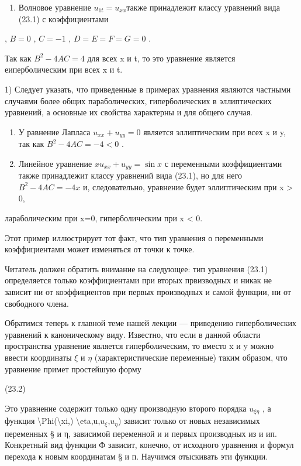 \documentclass[
]{article}
\providecommand{\tightlist}{%
  \setlength{\itemsep}{0pt}\setlength{\parskip}{0pt}}
\begin{document}
\begin{enumerate}
\def\labelenumi{\arabic{enumi}.}
\setcounter{enumi}{1}
\tightlist
\item
  Волновое уравнение \(u_{1t} = u_{xx}\)также принадлежит классу
  уравнений вида (23.1) с коэффициентами
\end{enumerate}

, \(B=0\) , \(C=-1\) , \(D=E=F=G=0\) .

Так как \(B^2 - 4AC = 4\) для всех x и t, то это уравнение является
еиперболическим при всех x и t.

1) Следует указать, что приведенные в примерах уравнения являются
частными случаями более общих параболических, гиперболических в
эллиптических уравнений, а основные их свойства характерны и для общего
случая.

\begin{enumerate}
\def\labelenumi{\arabic{enumi}.}
\setcounter{enumi}{2}
\item
  У равнение Лапласа \(u_{xx} + u_{yy} = 0\) является эллиптическим при
  всех x и y, так как \(B^2 - 4AC = - 4 < 0\) .
\item
  Линейное уравнение \(xu_{xx} + u_{yy} = \sin x\) с переменными
  коэффициентами также принадлежит классу уравнений вида (23.1), но для
  него \(B^2-4AC=-4x\) и, следовательно, уравнение будет эллиптическим
  при x \textgreater{} 0,
\end{enumerate}

лараболическим при x=0, гиперболическим при x \textless{} 0.

Этот пример иллюстрирует тот факт, что тип уравнения о переменными
коэффициентами может изменяться от точки к точке.

Читатель должен обратить внимание на следующее: тип уравнения (23.1)
определяется только коэффициентами при вторых првизводных и никак не
зависит ни от коэффициентов при первых производных и самой функции, ни
от свободного члена.

Обратимся теперь к главной теме нашей лекции --- приведению
гиперболических уравнений к каноническому виду. Известно, что если в
данной области пространства уравнение является гиперболическим, то
вместо x и y можно ввести координаты \(\xi\) и \(\eta\)
(характеристические переменные) таким образом, что уравнение примет
простейшую форму

(23.2)

Это уравнение содержит только одну производную второго порядка
\(u_{\xi\eta}\) , а функция \textbackslash Phi(\textbackslash xi,)
\textbackslash eta,u,\(u_{\xi}\),\(u_{\eta}\)) зависит только от новых
независимых переменных § и η, зависимой переменной и и первых
производных из и ип. Конкретный вид функции Ф зависит, конечно, от
исходного уравнения и формул перехода к новым координатам § и п.
Научимся отыскивать эти функции.
\end{document}
